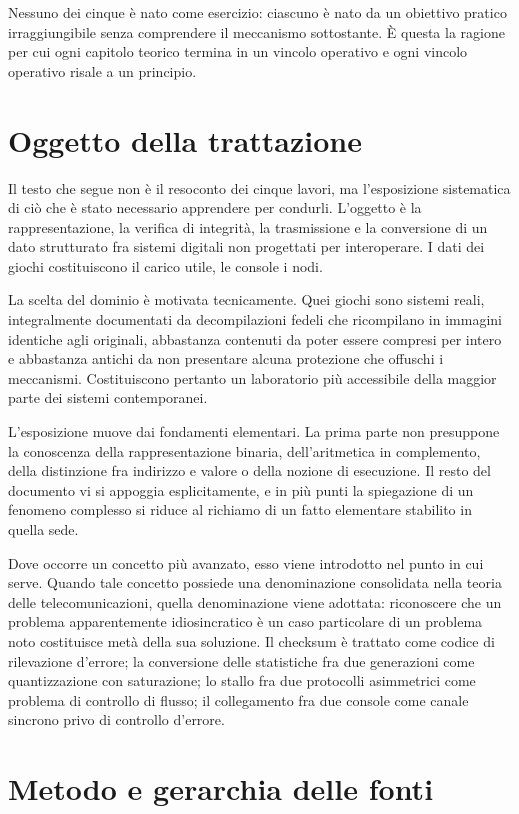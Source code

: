 Nessuno dei cinque è nato come esercizio: ciascuno è nato da un obiettivo pratico
irraggiungibile senza comprendere il meccanismo sottostante. È questa la ragione per cui
ogni capitolo teorico termina in un vincolo operativo e ogni vincolo operativo risale a un
principio.

\section*{Oggetto della trattazione}

Il testo che segue non è il resoconto dei cinque lavori, ma l'esposizione sistematica di
ciò che è stato necessario apprendere per condurli. L'oggetto è la rappresentazione, la
verifica di integrità, la trasmissione e la conversione di un dato strutturato fra sistemi
digitali non progettati per interoperare. I dati dei giochi costituiscono il carico utile,
le console i nodi.

La scelta del dominio è motivata tecnicamente. Quei giochi sono sistemi reali,
integralmente documentati da decompilazioni fedeli che ricompilano in immagini identiche
agli originali, abbastanza contenuti da poter essere compresi per intero e abbastanza
antichi da non presentare alcuna protezione che offuschi i meccanismi. Costituiscono
pertanto un laboratorio più accessibile della maggior parte dei sistemi contemporanei.

L'esposizione muove dai fondamenti elementari. La prima parte non presuppone la conoscenza
della rappresentazione binaria, dell'aritmetica in complemento, della distinzione fra
indirizzo e valore o della nozione di esecuzione. Il resto del documento vi si appoggia
esplicitamente, e in più punti la spiegazione di un fenomeno complesso si riduce al
richiamo di un fatto elementare stabilito in quella sede.

Dove occorre un concetto più avanzato, esso viene introdotto nel punto in cui serve. Quando
tale concetto possiede una denominazione consolidata nella teoria delle telecomunicazioni,
quella denominazione viene adottata: riconoscere che un problema apparentemente
idiosincratico è un caso particolare di un problema noto costituisce metà della sua
soluzione. Il checksum è trattato come codice di rilevazione d'errore; la conversione delle
statistiche fra due generazioni come quantizzazione con saturazione; lo stallo fra due
protocolli asimmetrici come problema di controllo di flusso; il collegamento fra due
console come canale sincrono privo di controllo d'errore.

\section*{Metodo e gerarchia delle fonti}

